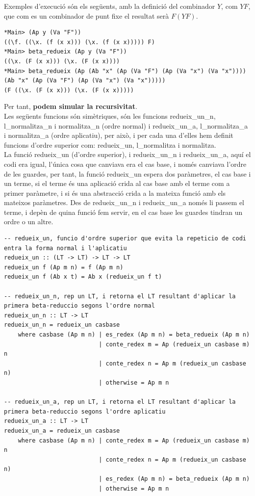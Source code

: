 \documentclass[10pt,a4paper]{article}
\begin{document}
Exemples d'execució són els següents, amb la definició del combinador $Y$, com $Y F$, que com es un combinador de punt fixe el resultat serà $F (Y F)$.

\lstset{language=Haskell, breaklines=true, basicstyle=\footnotesize}
\begin{lstlisting}[frame=mystyle]
*Main> (Ap y (Va "F"))
((\f. ((\x. (f (x x))) (\x. (f (x x))))) F)
*Main> beta_redueix (Ap y (Va "F"))
((\x. (F (x x))) (\x. (F (x x))))
*Main> beta_redueix (Ap (Ab "x" (Ap (Va "F") (Ap (Va "x") (Va "x")))) (Ab "x" (Ap (Va "F") (Ap (Va "x") (Va "x")))))
(F ((\x. (F (x x))) (\x. (F (x x)))))
\end{lstlisting}

Per tant, \textbf{podem simular la recursivitat}. \\

Les següents funcions són simètriques, són les funcions redueix\_un\_n, l\_normalitza\_n i normalitza\_n (ordre normal) i redueix\_un\_a, l\_normalitza\_a i normalitza\_a (ordre aplicatiu), per això, i per cada una d'elles hem definit funcions d'ordre superior com: redueix\_un, l\_normalitza i normalitza. \\

La funció redueix\_un (d'ordre superior), i redueix\_un\_n i redueix\_un\_a, aquí el codi era igual, l'única cosa que canviava era el cas base, i només canviava l'ordre de les guardes, per tant, la funció redueix\_un espera dos paràmetres, el cas base i un terme, si el terme és una aplicació crida al cas base amb el terme com a primer paràmetre, i si és una abstracció crida a la mateixa funció amb els mateixos paràmetres. Des de redueix\_un\_n i redueix\_un\_a només li passem el terme, i depèn de quina funció fem servir, en el cas base les guardes tindran un ordre o un altre.

\lstset{language=Haskell, breaklines=true, basicstyle=\footnotesize}
\begin{lstlisting}[frame=mystyle]
-- redueix_un, funcio d'ordre superior que evita la repeticio de codi entra la forma normal i l'aplicatiu
redueix_un :: (LT -> LT) -> LT -> LT
redueix_un f (Ap m n) = f (Ap m n)
redueix_un f (Ab x t) = Ab x (redueix_un f t)

-- redueix_un_n, rep un LT, i retorna el LT resultant d'aplicar la primera beta-reduccio segons l'ordre normal
redueix_un_n :: LT -> LT
redueix_un_n = redueix_un casbase
    where casbase (Ap m n) | es_redex (Ap m n) = beta_redueix (Ap m n)
                           | conte_redex m = Ap (redueix_un casbase m) n
                           | conte_redex n = Ap m (redueix_un casbase n)
                           | otherwise = Ap m n

-- redueix_un_a, rep un LT, i retorna el LT resultant d'aplicar la primera beta-reduccio segons l'ordre aplicatiu
redueix_un_a :: LT -> LT
redueix_un_a = redueix_un casbase
    where casbase (Ap m n) | conte_redex m = Ap (redueix_un casbase m) n
                           | conte_redex n = Ap m (redueix_un casbase n)
                           | es_redex (Ap m n) = beta_redueix (Ap m n)
                           | otherwise = Ap m n
\end{lstlisting}
\end{document}
